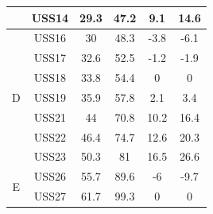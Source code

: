 \begin{table}[htbp]
\begin{tabular}{cccccc}
		& USS14  & 29.3 &           47.2            & 9.1  &            14.6            \\ \midrule
		\multirow{7}{*}{D}                 & USS16  &  30  &           48.3            & -3.8 &            -6.1            \\
		& USS17  & 32.6 &           52.5            & -1.2 &            -1.9            \\
		& USS18  & 33.8 &           54.4            &  0   &             0              \\
		& USS19  & 35.9 &           57.8            & 2.1  &            3.4             \\
		& USS21  &  44  &           70.8            & 10.2 &            16.4            \\
		& USS22  & 46.4 &           74.7            & 12.6 &            20.3            \\
		& USS23  & 50.3 &            81             & 16.5 &            26.6            \\ \midrule
		\multirow{2}{*}{E}                 & USS26  & 55.7 &           89.6            &  -6  &            -9.7            \\
		& USS27  & 61.7 &           99.3            &  0   &             0              \\ \bottomrule
	\end{tabular}
\end{table}

